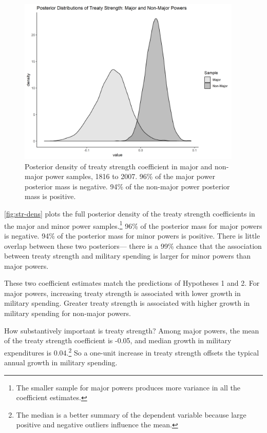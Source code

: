 \documentclass[12pt]{article}
\begin{document}
\begin{figure}[htbp]
	\centering
		\includegraphics[width=0.95\textwidth]{../figures/str-dens.png}
	\caption{Posterior density of treaty strength coefficient in major and non-major power samples, 1816 to 2007. 96\% of the major power posterior mass is negative. 94\% of the non-major power posterior mass is positive.}
	\label{fig:str-dens}
\end{figure}


\autoref{fig:str-dens} plots the full posterior density of the treaty strength coefficients in the major and minor power samples.\footnote{The smaller sample for major powers produces more variance in all the coefficient estimates.} 
96\% of the posterior mass for major powers is negative. 
94\% of the posterior mass for minor powers is positive. 
There is little overlap between these two posteriors--- there is a 99\% chance that the association between treaty strength and military spending is larger for minor powers than major powers. 


These two coefficient estimates match the predictions of Hypotheses 1 and 2. 
For major powers, increasing treaty strength is associated with lower growth in military spending. 
Greater treaty strength is associated with higher growth in military spending for non-major powers.


How substantively important is treaty strength? 
Among major powers, the mean of the treaty strength coefficient is -0.05, and median growth in military expenditures is 0.04.\footnote{The median is a better summary of the dependent variable because large positive and negative outliers influence the mean.} 
So a one-unit increase in treaty strength offsets the typical annual growth in military spending. 
\end{document}
